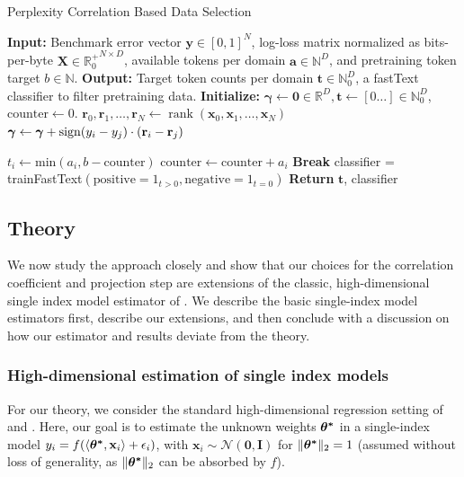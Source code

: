 \documentclass{article} %
\DeclareMathOperator{\rank}{rank}
\begin{document}
\begin{algorithm}
\caption{Perplexity Correlation Based Data Selection}
\label{main-algorithm}
\begin{algorithmic}[]
\State \textbf{Input:} Benchmark error vector $\mathbf{y}\in[0,1]^N$, log-loss matrix normalized as bits-per-byte $\mathbf{X}\in{\mathbb{R}_0^+}^{N\times D}$, available tokens per domain $\mathbf{a}\in\mathbb{N}^D$, and pretraining token target $b\in\mathbb{N}$.
\State \textbf{Output:} Target token counts per domain $\mathbf{t} \in \mathbb{N}_0^D$, a fastText classifier to filter pretraining data.
\State \textbf{Initialize:} $\bm{\gamma} \gets \mathbf{0} \in \mathbb{R}^D, \mathbf{t} \gets [0\hdots] \in \mathbb{N}_0^D$, $\text{counter} \gets 0$.
\State $\mathbf{r}_0, \mathbf{r}_1, \dots, \mathbf{r}_N \gets \rank(\mathbf{x}_0, \mathbf{x}_1, \dots, \mathbf{x}_N)$ 
            \State $\bm{\gamma} \gets \bm{\gamma} + \operatorname{sign}(y_i - y_j) \cdot (\mathbf{r}_i - \mathbf{r}_j)$
\EndFor

\State $t_i \gets \text{min}(a_i, b-\text{counter})$
\State $\text{counter} \gets \text{counter} + a_i$
\State \textbf{Break}
\EndIf
\EndFor
classifier = trainFastText$\left(\text{positive}=1_{t>0}, \text{negative}=1_{t=0}\right)$
\State \textbf{Return} $\mathbf{t}$, classifier
\end{algorithmic}
\end{algorithm}

\subsection{Theory}
\label{sec:theory}
We now study the approach closely and show that our choices for the correlation coefficient and projection step are 
extensions of the classic, high-dimensional single index model estimator of \citet{plan2016high}. We describe the basic single-index model estimators first, describe our extensions, and then conclude with a discussion on how our estimator and results deviate from the theory.

\subsubsection{High-dimensional estimation of single index models}

For our theory, we consider the standard high-dimensional regression setting of \citet{plan2016high} and \citet{chen2017robust}. Here, our goal is to estimate the unknown weights $\bm{{\bf{\theta}^*}}$ in a single-index model $y_i = f(\langle \bm{{\bf{\theta}^*}}, \mathbf{x}_i\rangle + \epsilon_i)$, with $\textbf{x}_i \sim \mathcal{N}(\mathbf{0}, \mathbf{I})$ for $\|\bm{{\bf{\theta}^*}}\|_2 = 1$ (assumed without loss of generality, as $\|\bm{{\bf{\theta}^*}}\|_2$ can be absorbed by $f$).
\end{document}
